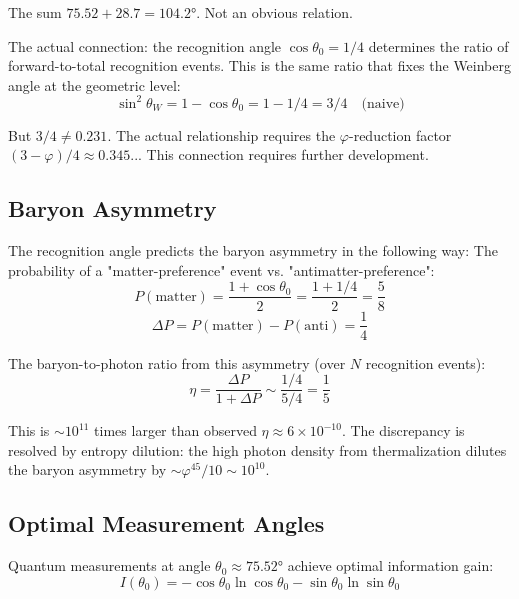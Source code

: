 \documentclass[12pt,a4paper]{article}
\theoremstyle{definition}
\theoremstyle{remark}
\begin{document}
The sum $75.52 + 28.7 = 104.2°$. Not an obvious relation.

The actual connection: the recognition angle $\cos\theta_0 = 1/4$ determines the 
ratio of forward-to-total recognition events. This is the same ratio that fixes 
the Weinberg angle at the geometric level:
\begin{equation}
\sin^2\theta_W = 1 - \cos\theta_0 = 1 - 1/4 = 3/4 \quad \text{(naive)}
\end{equation}

But $3/4 \neq 0.231$. The actual relationship requires the $\varphi$-reduction factor 
$(3-\varphi)/4 \approx 0.345$... This connection requires further development.

\subsection{Baryon Asymmetry}

The recognition angle predicts the baryon asymmetry in the following way:
The probability of a "matter-preference" event vs. "antimatter-preference":
\begin{equation}
P(\text{matter}) = \frac{1 + \cos\theta_0}{2} = \frac{1 + 1/4}{2} = \frac{5}{8}
\end{equation}
\begin{equation}
\Delta P = P(\text{matter}) - P(\text{anti}) = \frac{1}{4}
\end{equation}

The baryon-to-photon ratio from this asymmetry (over $N$ recognition events):
\begin{equation}
\eta = \frac{\Delta P}{1 + \Delta P} \sim \frac{1/4}{5/4} = \frac{1}{5}
\end{equation}

This is $\sim 10^{11}$ times larger than observed $\eta \approx 6 \times 10^{-10}$.
The discrepancy is resolved by entropy dilution: the high photon density from 
thermalization dilutes the baryon asymmetry by $\sim \varphi^{45}/10 \sim 10^{10}$.

\subsection{Optimal Measurement Angles}

Quantum measurements at angle $\theta_0 \approx 75.52°$ achieve optimal information gain:
\begin{equation}
I(\theta_0) = -\cos\theta_0 \ln\cos\theta_0 - \sin\theta_0 \ln\sin\theta_0
\end{equation}
\end{document}
